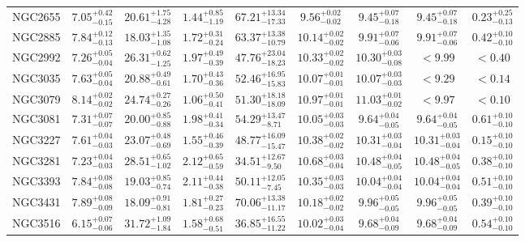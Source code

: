 \documentclass[onecolumn]{mn2e}
\begin{document}
{\begin{center}
\begin{longtable}{lcccccccc}
NGC2655 & $7.05_{-0.15}^{+0.42}$ & $20.61_{-4.28}^{+1.75}$ & $1.44_{-1.19}^{+0.85}$ &$67.21_{-17.33}^{+13.34}$ & $9.56_{-0.02}^{+0.02}$ & $9.45_{-0.18}^{+0.07}$ & $9.45_{-0.18}^{+0.07}$ & $0.23_{-0.13}^{+0.25}$ \\
NGC2885 & $7.84_{-0.13}^{+0.12}$ & $18.03_{-1.08}^{+1.35}$ & $1.72_{-0.24}^{+0.31}$ &$63.37_{-10.79}^{+13.38}$ & $10.14_{-0.02}^{+0.02}$ & $9.91_{-0.06}^{+0.07}$ & $9.91_{-0.06}^{+0.07}$ & $0.42_{-0.10}^{+0.10}$ \\
NGC2992 & $7.26_{-0.04}^{+0.05}$ & $26.31_{-1.25}^{+0.62}$ & $1.97_{-0.39}^{+0.49}$ &$47.76_{-18.23}^{+23.04}$ & $10.33_{-0.02}^{+0.02}$ & $10.30_{-0.08}^{+0.03}$ & $<9.99$ & $<0.40$ \\
NGC3035 & $7.63_{-0.04}^{+0.05}$ & $20.88_{-0.61}^{+0.49}$ & $1.70_{-0.36}^{+0.43}$ &$52.46_{-15.83}^{+16.95}$ & $10.07_{-0.01}^{+0.01}$ & $10.07_{-0.03}^{+0.03}$ & $<9.29$ & $<0.14$ \\
NGC3079 & $8.14_{-0.02}^{+0.02}$ & $24.74_{-0.26}^{+0.27}$ & $1.06_{-0.41}^{+0.50}$ &$51.30_{-18.09}^{+18.18}$ & $10.97_{-0.01}^{+0.01}$ & $11.03_{-0.02}^{+0.01}$ & $<9.97$ & $<0.10$ \\
NGC3081 & $7.31_{-0.07}^{+0.07}$ & $20.00_{-0.88}^{+0.85}$ & $1.98_{-0.34}^{+0.41}$ &$54.29_{-8.71}^{+13.47}$ & $10.05_{-0.03}^{+0.03}$ & $9.64_{-0.05}^{+0.04}$ & $9.64_{-0.05}^{+0.04}$ & $0.61_{-0.10}^{+0.10}$ \\
NGC3227 & $7.61_{-0.03}^{+0.04}$ & $23.07_{-0.69}^{+0.48}$ & $1.55_{-0.39}^{+0.46}$ &$48.77_{-15.47}^{+16.09}$ & $10.38_{-0.02}^{+0.02}$ & $10.31_{-0.04}^{+0.03}$ & $10.31_{-0.04}^{+0.03}$ & $0.15_{-0.10}^{+0.10}$ \\
NGC3281 & $7.23_{-0.03}^{+0.04}$ & $28.51_{-1.02}^{+0.65}$ & $2.12_{-0.59}^{+0.65}$ &$34.51_{-9.50}^{+12.67}$ & $10.68_{-0.04}^{+0.03}$ & $10.48_{-0.05}^{+0.04}$ & $10.48_{-0.05}^{+0.04}$ & $0.38_{-0.10}^{+0.10}$ \\
NGC3393 & $7.84_{-0.08}^{+0.08}$ & $19.03_{-0.74}^{+0.85}$ & $2.11_{-0.38}^{+0.44}$ &$50.11_{-7.45}^{+12.05}$ & $10.35_{-0.03}^{+0.03}$ & $10.04_{-0.04}^{+0.04}$ & $10.04_{-0.04}^{+0.04}$ & $0.51_{-0.10}^{+0.10}$ \\
NGC3431 & $7.89_{-0.09}^{+0.08}$ & $18.09_{-0.81}^{+0.91}$ & $1.81_{-0.23}^{+0.27}$ &$70.06_{-11.17}^{+13.38}$ & $10.18_{-0.02}^{+0.02}$ & $9.96_{-0.05}^{+0.05}$ & $9.96_{-0.05}^{+0.05}$ & $0.39_{-0.10}^{+0.10}$ \\
NGC3516 & $6.15_{-0.06}^{+0.07}$ & $31.72_{-1.84}^{+1.09}$ & $1.58_{-0.51}^{+0.68}$ &$36.85_{-11.22}^{+16.55}$ & $10.02_{-0.04}^{+0.03}$ & $9.68_{-0.09}^{+0.04}$ & $9.68_{-0.09}^{+0.04}$ & $0.54_{-0.10}^{+0.10}$ \\

\end{longtable}
\end{center}}
\end{document}
